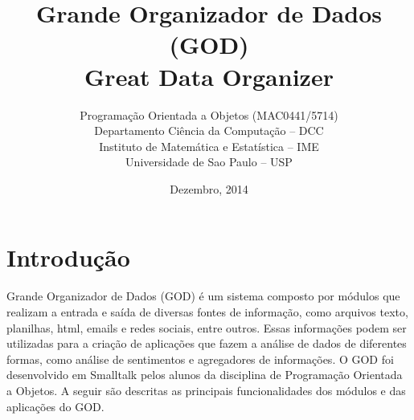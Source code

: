 \documentclass[12pt]{article}
\title{Grande Organizador de Dados (GOD) \\Great Data Organizer}
\author{
Programação Orientada a Objetos (MAC0441/5714)\\
Departamento Ciência da Computação -- DCC\\
Instituto de Matemática e Estatística -- IME\\
Universidade de Sao Paulo -- USP
}
\date{Dezembro, 2014}
\begin{document}
\maketitle
\newpage
\tableofcontents
\newpage

\section{Introdução}
Grande Organizador de Dados (GOD) é um sistema composto por módulos que realizam a entrada e saída de diversas fontes de informação, como arquivos texto, planilhas, html, emails e redes sociais, entre outros. 
Essas informações podem ser utilizadas para a criação de aplicações que fazem a análise de dados de diferentes formas, como análise de sentimentos e agregadores de informações.
O GOD foi desenvolvido em Smalltalk pelos alunos da disciplina de Programação Orientada a Objetos. A seguir são descritas as principais funcionalidades dos módulos e das aplicações do GOD.



\newpage

\newpage

\newpage

\newpage

\newpage

\newpage

\newpage

\newpage

\newpage

\newpage

\newpage

\newpage

\newpage

\newpage


\newpage

\newpage

\end{document}

